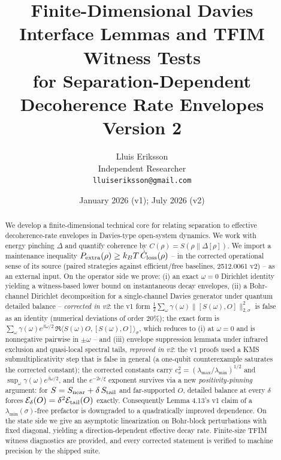 \documentclass[11pt]{article}
\title{Finite-Dimensional Davies Interface Lemmas and TFIM Witness Tests\\
for Separation-Dependent Decoherence Rate Envelopes\\
{\normalsize Version 2}}
\author{Lluis Eriksson\\ Independent Researcher\\ \texttt{lluiseriksson@gmail.com}}
\date{January 2026 (v1); July 2026 (v2)}
\theoremstyle{remark}
\begin{document}
\maketitle

\begin{abstract}
We develop a finite-dimensional technical core for relating separation to
effective decoherence-rate envelopes in Davies-type open-system dynamics.
We work with energy pinching $\Delta$ and quantify coherence by
$C(\rho) = S(\rho\|\Delta[\rho])$. We import a maintenance inequality
$P_{\rm extra}(\rho) \ge k_B T\, \dot C_{\rm loss}(\rho)$ -- in the
corrected operational sense of its source (paired strategies against
efficient/free baselines, 2512.0061 v2) -- as an external input. On the operator side we prove: (i) an exact $\omega = 0$ Dirichlet
identity yielding a witness-based lower bound on instantaneous decay
envelopes, (ii) a Bohr-channel Dirichlet decomposition for a single-channel
Davies generator under quantum detailed balance -- \emph{corrected in v2}:
the v1 form $\frac12\sum_\omega \gamma(\omega)\|[S(\omega),O]\|^2_{2,\sigma}$
is false as an identity (numerical deviations of order $20\%$); the exact
form is $\sum_\omega \gamma(\omega) e^{\beta\omega/2}\,
\Re\langle S(\omega)O, [S(\omega),O]\rangle_\sigma$, which reduces to (i) at
$\omega = 0$ and is nonnegative pairwise in $\pm\omega$ -- and (iii)
envelope suppression lemmata under infrared exclusion and quasi-local
spectral tails, \emph{reproved in v2}: the v1 proofs used a KMS
submultiplicativity step that is false in general (a one-qubit
counterexample saturates the corrected constant); the corrected constants
carry $c_\sigma^2 = (\lambda_{\max}/\lambda_{\min})^{1/2}$ and
$\sup_\omega \gamma(\omega)e^{\beta\omega/2}$, and the $e^{-2\epsilon/\xi}$
exponent survives via a new \emph{positivity-pinning} argument: for
$S = S_{\rm near} + \delta\, S_{\rm tail}$ and far-supported $O$, detailed
balance at every $\delta$ forces $\mathcal{E}_\delta(O) = \delta^2
\mathcal{E}_{\rm tail}(O)$ exactly. Consequently Lemma 4.13's v1 claim of a
$\lambda_{\min}(\sigma)$-free prefactor is downgraded to a quadratically
improved dependence. On the state side we give an asymptotic linearization
on Bohr-block perturbations with fixed diagonal, yielding a
direction-dependent effective decay rate. Finite-size TFIM witness
diagnostics are provided, and every corrected statement is verified to
machine precision by the shipped suite.
\end{abstract}
\end{document}
